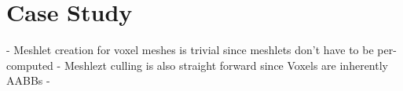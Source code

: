 \chapter{Case Study}


- Meshlet creation for voxel meshes is trivial since meshlets don't have to be per-computed
- Meshlezt culling is also straight forward since Voxels are inherently AABBs
- 